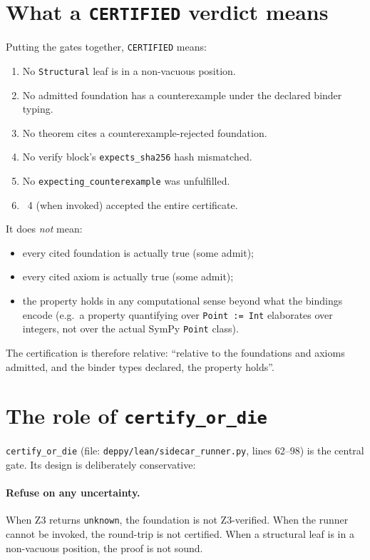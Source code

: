 \section{What a \texttt{CERTIFIED} verdict means}

Putting the gates together, \texttt{CERTIFIED} means:

\begin{enumerate}[leftmargin=1.7em]
  \item No \texttt{Structural} leaf is in a non-vacuous position.
  \item No admitted foundation has a counterexample under the
    declared binder typing.
  \item No theorem cites a counterexample-rejected foundation.
  \item No verify block's \texttt{expects\_sha256} hash mismatched.
  \item No \texttt{expecting\_counterexample} was unfulfilled.
  \item \Lean{}~4 (when invoked) accepted the entire certificate.
\end{enumerate}

It does \emph{not} mean:
\begin{itemize}[leftmargin=1.7em]
  \item every cited foundation is actually true (some admit);
  \item every cited axiom is actually true (some admit);
  \item the property holds in any computational sense beyond what
    the bindings encode (e.g.\ a property quantifying over
    \texttt{Point := Int} elaborates over integers, not over the
    actual SymPy \texttt{Point} class).
\end{itemize}

The certification is therefore relative: ``relative to the
foundations and axioms admitted, and the binder types declared,
the property holds''.

\section{The role of \texttt{certify\_or\_die}}

\texttt{certify\_or\_die} (file:
\texttt{deppy/lean/sidecar\_runner.py}, lines 62--98) is the
central gate.  Its design is deliberately conservative:

\paragraph{Refuse on any uncertainty.}  When Z3 returns
\texttt{unknown}, the foundation is not Z3-verified.  When the
\Lean{} runner cannot be invoked, the round-trip is not certified.
When a structural leaf is in a non-vacuous position, the proof is
not sound.

